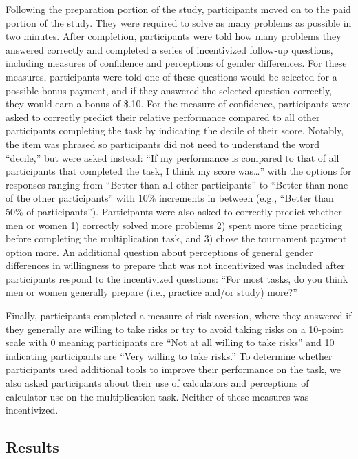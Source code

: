 \documentclass[a4paper,nobind]{templates/ociamthesis}
\begin{document}
Following the preparation portion of the study, participants moved on to the paid portion of the study. They were required to solve as many problems as possible in two minutes. After completion, participants were told how many problems they answered correctly and completed a series of incentivized follow-up questions, including measures of confidence and perceptions of gender differences. For these measures, participants were told one of these questions would be selected for a possible bonus payment, and if they answered the selected question correctly, they would earn a bonus of \$.10. For the measure of confidence, participants were asked to correctly predict their relative performance compared to all other participants completing the task by indicating the decile of their score. Notably, the item was phrased so participants did not need to understand the word ``decile,'' but were asked instead: ``If my performance is compared to that of all participants that completed the task, I think my score was\ldots{}'' with the options for responses ranging from ``Better than all other participants'' to ``Better than none of the other participants'' with 10\% increments in between (e.g., ``Better than 50\% of participants''). Participants were also asked to correctly predict whether men or women 1) correctly solved more problems 2) spent more time practicing before completing the multiplication task, and 3) chose the tournament payment option more. An additional question about perceptions of general gender differences in willingness to prepare that was not incentivized was included after participants respond to the incentivized questions: ``For most tasks, do you think men or women generally prepare (i.e., practice and/or study) more?''

Finally, participants completed a measure of risk aversion, where they answered if they generally are willing to take risks or try to avoid taking risks \autocite{Dohmen2011} on a 10-point scale with 0 meaning participants are ``Not at all willing to take risks'' and 10 indicating participants are ``Very willing to take risks.'' To determine whether participants used additional tools to improve their performance on the task, we also asked participants about their use of calculators and perceptions of calculator use on the multiplication task. Neither of these measures was incentivized.

\hypertarget{results}{%
\subsection{Results}\label{results}}
\end{document}
